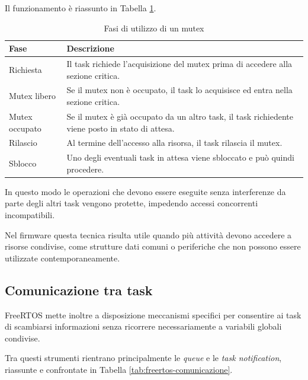 Il funzionamento è riassunto in Tabella \ref{tab:mutex-fasi}.

\begin{table}[H]
    \centering
    \begin{tabular}{lp{9cm}}
        \hline
        \textbf{Fase} & \textbf{Descrizione} \\
        \hline
        Richiesta & Il task richiede l'acquisizione del mutex prima di accedere alla sezione critica. \\ \hline
        Mutex libero & Se il mutex non è occupato, il task lo acquisisce ed entra nella sezione critica. \\ \hline
        Mutex occupato & Se il mutex è già occupato da un altro task, il task richiedente viene posto in stato di attesa. \\ \hline
        Rilascio & Al termine dell'accesso alla risorsa, il task rilascia il mutex. \\ \hline
        Sblocco & Uno degli eventuali task in attesa viene sbloccato e può quindi procedere. \\ \hline
    \end{tabular}
    \caption{Fasi di utilizzo di un mutex}
    \label{tab:mutex-fasi}
\end{table}

In questo modo le operazioni che devono essere eseguite senza interferenze
da parte degli altri task vengono protette, impedendo accessi concorrenti
incompatibili.

Nel firmware questa tecnica risulta utile quando più attività devono
accedere a risorse condivise, come strutture dati comuni o periferiche che
non possono essere utilizzate contemporaneamente.

\subsection{Comunicazione tra task}
FreeRTOS mette inoltre a disposizione meccanismi specifici per consentire
ai task di scambiarsi informazioni senza ricorrere necessariamente a
variabili globali condivise.

Tra questi strumenti rientrano principalmente le \textit{queue} e le
\textit{task notification}, riassunte e confrontate in Tabella
\ref{tab:freertos-comunicazione}.

